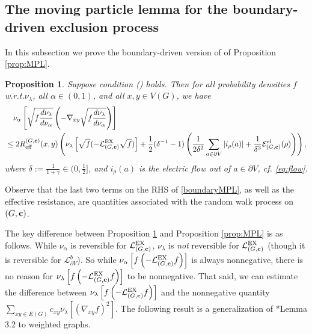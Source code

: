 \documentclass[11pt]{amsart}
\theoremstyle{plain}
\newtheorem{proposition}[lemma]{Proposition}
\theoremstyle{definition}
\theoremstyle{remark}
\begin{document}
\subsection{The moving particle lemma for the boundary-driven exclusion process} \label{sec:boundaryMPL}

In this subsection we prove the boundary-driven version of of Proposition \ref{prop:MPL}.

\begin{proposition}
\label{prop:boundaryMPL}
Suppose condition () holds. Then for all probability densities $f$ w.r.t.\@ $\nu_\lambda$, all $\alpha\in (0,1)$, and all $x,y\in V(G)$, we have
\begin{align}
\label{boundaryMPL}
& \quad \nu_\alpha\left[\sqrt{f \frac{d\nu_\lambda}{d\nu_\alpha}} \left(-\nabla_{xy}\sqrt{f\frac{d\nu_\lambda}{d\nu_\alpha}}\right)\right] \\ 
\nonumber & \leq  2 R^{(G,{\bf c})}_{\rm eff}(x,y) \left(\nu_\lambda\left[\sqrt f(-\mathcal{L}^{\rm EX}_{(G,{\bf c})}\sqrt f)\right] + \frac{1}{2}(\delta^{-1}-1)\left( \frac{1}{2\delta^2} \sum_{a\in \partial V} |i_\rho(a)| + \frac{1}{\delta^3} \mathcal{E}^{\rm el}_{(G,{\bf c})} (\rho) \right) \right),
\end{align}
where $\delta :=\frac{1}{1+\gamma} \in (0, \frac{1}{2}]$, and $i_\rho(a)$ is the electric flow out of $a\in \partial V$, \emph{cf.\@} \eqref{eq:flow}.
\end{proposition}

Observe that the last two terms on the RHS of \eqref{boundaryMPL}, as well as the effective resistance, are quantities associated with the random walk process on $(G,{\bf c})$. 

The key difference between Proposition \ref{prop:boundaryMPL} and Proposition \ref{prop:MPL} is as follows. While $\nu_\alpha$ is reversible for $\mathcal{L}^{\rm EX}_{(G,{\bf c})}$, $\nu_\lambda$ is \emph{not} reversible for $\mathcal{L}^{\rm EX}_{(G,{\bf c})}$ (though it is reversible for $\mathcal{L}^b_{\partial V}$). So while $\nu_\alpha\left[f\left(-\mathcal{L}^{\rm EX}_{(G,{\bf c})} f\right)\right]$ is always nonnegative, there is no reason for $\nu_\lambda\left[f\left(-\mathcal{L}^{\rm EX}_{(G,{\bf c})} f \right)\right]$ to be nonnegative. That said, we can estimate the difference between $\nu_\lambda\left[f\left(-\mathcal{L}^{\rm EX}_{(G,{\bf c})} f \right)\right]$ and the nonnegative quantity $\sum_{xy\in E(G)} c_{xy} \nu_\lambda\left[(\nabla_{xy} f)^2\right]$. The following result is a generalization of \cite{BDGJL03}*{Lemma 3.2} to weighted graphs.
\end{document}
